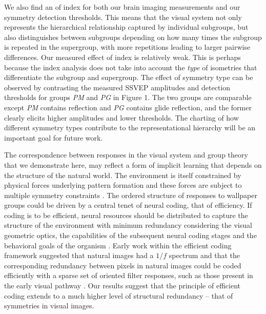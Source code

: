 \documentclass[9pt,twocolumn,twoside,lineno]{pnas-new}
\begin{document}
We also find an of index for both our brain imaging measurements and our symmetry detection thresholds. This means that the visual system not only represents the hierarchical relationship captured by individual subgroups, but also distinguishes between subgroups depending on how many times the subgroup is repeated in the supergroup, with more repetitions leading to larger pairwise differences. Our measured effect of index is relatively weak. This is perhaps because the index analysis does not take into account the \textit{type} of isometries that differentiate the subgroup and supergroup. The effect of symmetry type can be observed by contrasting the measured SSVEP amplitudes and detection thresholds for groups \textit{PM} and \textit{PG} in Figure 1. The two groups are comparable except \textit{PM} contains reflection and \textit{PG} contains glide reflection, and the former clearly elicits higher amplitudes and lower thresholds. The charting of how different symmetry types contribute to the representational hierarchy will be an important goal for future work.

The correspondence between responses in the visual system and group theory that we demonstrate here, may reflect a form of implicit learning that depends on the structure of the natural world. The environment is itself constrained by physical forces underlying pattern formation and these forces are subject to multiple symmetry constraints \cite{RN1634}. The ordered structure of responses to wallpaper groups could be driven by a central tenet of neural coding, that of efficiency. If coding is to be efficient, neural resources should be distributed to capture the structure of the environment with minimum redundancy considering the visual geometric optics, the capabilities of the subsequent neural coding stages and the behavioral goals of the organism \cite{RN1758, RN1760, RN1757, RN1756}. Early work within the efficient coding framework suggested that natural images had a $1/f$ spectrum and that the corresponding redundancy between pixels in natural images could be coded efficiently with a sparse set of oriented filter responses, such as those present in the early visual pathway \cite{RN1740, RN1446}. Our results suggest that the principle of efficient coding extends to a much higher level of structural redundancy – that of symmetries in visual images. 
\end{document}
